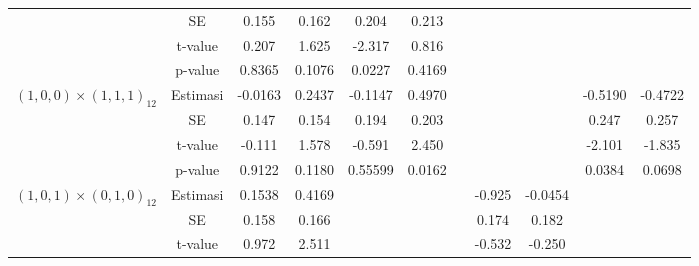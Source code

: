\begin{enumerate}[label=\alph*.]
\begin{longtable}{|c|c|c|c|c|c|c|c|c|c|c|}
            & SE
            & {0.155} & {0.162}
            & {0.204} & {0.213} & {}
            & {} & {}
            & {} & {} \\ \cline{2-11}

            & t-value
            & {0.207} & {1.625}
            & {-2.317} & {0.816} & {}
            & {} & {}
            & {} & {} \\ \cline{2-11}

            & p-value
            & {0.8365} & {0.1076}
            & {0.0227} & {0.4169} & {}
            & {} & {}
            & {} & {} \\ \hline

            \multirow{4}{*}{$(1,0,0)\times(1,1,1)_{12}$}
            & Estimasi
            & {-0.0163} & {0.2437}
            & {-0.1147} & {0.4970} & {}
            & {} & {}
            & {-0.5190} & {-0.4722} \\ \cline{2-11}

            & SE
            & {0.147} & {0.154}
            & {0.194} & {0.203} & {}
            & {} & {}
            & {0.247} & {0.257} \\ \cline{2-11}

            & t-value
            & {-0.111} & {1.578}
            & {-0.591} & {2.450} & {}
            & {} & {}
            & {-2.101} & {-1.835} \\ \cline{2-11}

            & p-value
            & {0.9122} & {0.1180}
            & {0.55599} & {0.0162} & {}
            & {} & {}
            & {0.0384} & {0.0698} \\ \hline

            \multirow{4}{*}{$(1,0,1)\times(0,1,0)_{12}$}
            & Estimasi
            & {0.1538} & {0.4169}
            & {} & {} & {}
            & {-0.925} & {-0.0454}
            & {} & {} \\ \cline{2-11}

            & SE
            & {0.158} & {0.166}
            & {} & {} & {}
            & {0.174} & {0.182}
            & {} & {} \\ \cline{2-11}

            & t-value
            & {0.972} & {2.511}
            & {} & {} & {}
            & {-0.532} & {-0.250}
            & {} & {} \\ \cline{2-11}


\end{longtable}
\end{enumerate}
